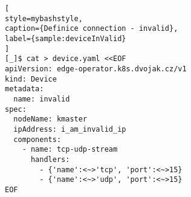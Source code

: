 \begin{lstfloat}
\begin{lstlisting}[
style=mybashstyle,
caption={Definice connection - invalid},
label={sample:deviceInValid}
]
[_]$ cat > device.yaml <<EOF
apiVersion: edge-operator.k8s.dvojak.cz/v1
kind: Device
metadata:
  name: invalid
spec:
  nodeName: kmaster
  ipAddress: i_am_invalid_ip
  components:
    - name: tcp-udp-stream
      handlers:
        - {'name':<~>'tcp', 'port':<~>15}
        - {'name':<~>'udp', 'port':<~>15}
EOF
\end{lstlisting}
\end{lstfloat}
